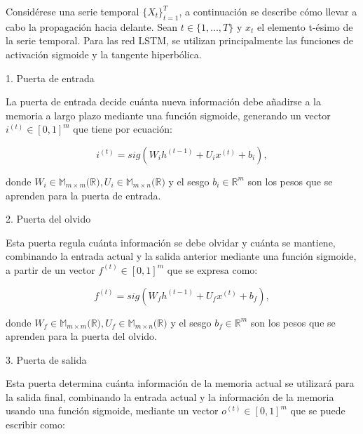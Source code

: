 \documentclass[12pt,twoside]{article}
\begin{document}
Considérese una serie temporal $\{X_t\}_{t=1}^T$, a continuación se describe cómo llevar a cabo la propagación hacia delante. Sean $t \in \{1,...,T\}$ y $x_t$ el elemento t-ésimo de la serie temporal. Para las red LSTM, se utilizan principalmente las funciones de activación sigmoide y la tangente hiperbólica.

\vspace{0.5em}
\noindent\textnormal{\large 1. Puerta de entrada}
\vspace{0.2em}

La puerta de entrada decide cuánta nueva información debe añadirse a la memoria a largo plazo mediante una función sigmoide, generando un vector $i^{(t)} \in [0,1]^m$ que tiene por ecuación:

\begin{equation}
i^{(t)} = sig(W_ih^{(t-1)} + U_ix^{(t)} +  b_i),
\end{equation}

donde $W_i \in \mathbb{M}_{m \times m}(\mathbb{R)}, U_i \in \mathbb{M}_{m \times n}(\mathbb{R)}$ y el sesgo $b_i \in \mathbb{R}^m$ son los pesos que se aprenden para la puerta de entrada.

\vspace{0.5em}
\noindent\textnormal{\large 2. Puerta del olvido}
\vspace{0.2em}

Esta puerta regula cuánta información se debe olvidar y cuánta se mantiene, combinando la entrada actual y la salida anterior mediante una función sigmoide, a partir de un vector $f^{(t)} \in [0,1]^m$ que se expresa como:

 \begin{equation}
 f^{(t)} = sig(W_fh^{(t-1)} + U_fx^{(t)} +  b_f),  
 \end{equation}

donde $W_f \in \mathbb{M}_{m \times m}(\mathbb{R)}, U_f \in \mathbb{M}_{m \times n}(\mathbb{R)}$ y el sesgo $b_f \in \mathbb{R}^m$ son los pesos que se aprenden para la puerta del olvido.

\vspace{0.5em}
\noindent\textnormal{\large 3. Puerta de salida}
\vspace{0.2em}

Esta puerta determina cuánta información de la memoria actual se utilizará para la salida final, combinando la entrada actual y la información de la memoria usando una función sigmoide, mediante un vector $o^{(t)} \in [0,1]^m$ que se puede escribir como:
\end{document}
